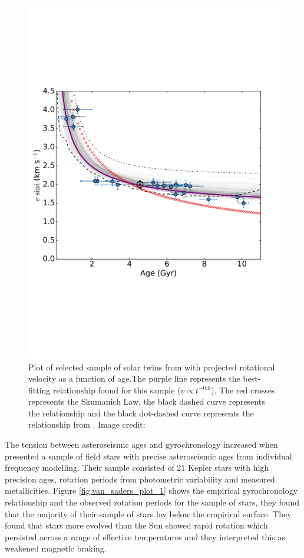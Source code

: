 \begin{figure}[h]
    \centering
    \includegraphics[scale=0.35]{Figures/2-Historical_overview/dos_santos_2016.pdf}
    \caption[Rotational evolution of sample of solar twins from \citet{dos_Santos_etal_2016} ]{Plot of selected sample of solar twins from \citet{dos_Santos_etal_2016} with projected rotational velocity as a function of age.The purple line represents the best-fitting relationship found for this sample ($v \propto t^{-0.6}$). The red crosses represents the Skumanich Law, the black dashed curve represents the \citet{do_Nascimento_etal_2014} relationship and the black dot-dashed curve represents the relationship from \citet{Pace_Pasquini_2004}. Image credit: \citet{dos_Santos_etal_2016}}
    \label{fig:dos_santos_2016}
\end{figure}

The tension between asteroseismic ages and gyrochronology increased when \citet{van_Saders_etal_2016} presented a sample of field stars with precise asteroseismic ages from individual frequency modelling. Their sample consisted of 21 Kepler stars with high precision ages, rotation periods from photometric variability and measured metallicities. Figure \ref{fig:van_saders_plot_1} shows the empirical gyrochronology relationship and the observed rotation periods for the \citet{van_Saders_etal_2016} sample of stars, they found that the majority of their sample of stars lay below the empirical surface. They found that stars more evolved than the Sun showed rapid rotation which persisted across a range of effective temperatures and they interpreted this as weakened magnetic braking.

